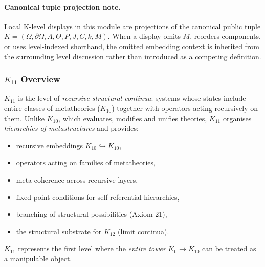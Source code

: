 



\paragraph{Canonical tuple projection note.}
Local K-level displays in this module are projections of the canonical public tuple \(K=(\Omega,\partial\Omega,A,\Theta,P,J,C,k,M)\). When a display omits \(M\), reorders components, or uses level-indexed shorthand, the omitted embedding context is inherited from the surrounding level discussion rather than introduced as a competing definition.

\subsubsection{$K_{11}$ Overview}
\label{sec:k11-overview}

$K_{11}$ is the level of \emph{recursive structural continua}: systems whose
states include entire classes of metatheories ($K_{10}$) together with
operators acting recursively on them. Unlike $K_{10}$, which evaluates,
modifies and unifies theories, $K_{11}$ organises \emph{hierarchies of
metastructures} and provides:
\begin{itemize}
    \item recursive embeddings $K_{10}\hookrightarrow K_{10}$,
    \item operators acting on families of metatheories,
    \item meta-coherence across recursive layers,
    \item fixed-point conditions for self-referential hierarchies,
    \item branching of structural possibilities (Axiom 21),
    \item the structural substrate for $K_{12}$ (limit continua).
\end{itemize}

$K_{11}$ represents the first level where the \emph{entire tower} $K_0 \to K_{10}$
can be treated as a manipulable object.


